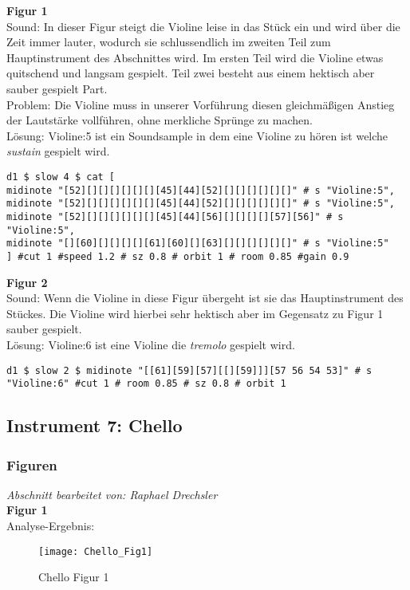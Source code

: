 \documentclass[
10pt, %
a4paper, %
oneside, %
headinclude,footinclude, %
BCOR5mm, %
]{scrartcl}
\begin{document}
\noindent\textbf{Figur 1}\\
Sound: In dieser Figur steigt die Violine leise in das Stück ein und wird über die Zeit immer lauter, wodurch sie schlussendlich im zweiten Teil 
zum Hauptinstrument des Abschnittes wird. Im ersten Teil wird die Violine etwas quitschend und langsam gespielt. Teil zwei besteht aus einem hektisch aber sauber gespielt Part.\\
Problem: Die Violine muss in unserer Vorführung diesen gleichmäßigen Anstieg der Lautstärke vollführen, ohne merkliche Sprünge zu machen.\\
Lösung: Violine:5 ist ein Soundsample in dem eine Violine zu hören ist welche \textit{sustain} gespielt wird.
\begin{lstlisting}
d1 $ slow 4 $ cat [
midinote "[52][][][][][][][45][44][52][][][][][][]" # s "Violine:5",
midinote "[52][][][][][][][45][44][52][][][][][][]" # s "Violine:5",
midinote "[52][][][][][][][45][44][56][][][][][57][56]" # s "Violine:5",
midinote "[][60][][][][][61][60][][63][][][][][][]" # s "Violine:5"
] #cut 1 #speed 1.2 # sz 0.8 # orbit 1 # room 0.85 #gain 0.9
\end{lstlisting}
\noindent\textbf{Figur 2}\\
Sound: Wenn die Violine in diese Figur übergeht ist sie das Hauptinstrument des Stückes. Die Violine wird hierbei sehr hektisch aber im Gegensatz zu Figur 1 sauber gespielt.\\
Lösung: Violine:6 ist eine Violine die \textit{tremolo} gespielt wird.
\begin{lstlisting}
d1 $ slow 2 $ midinote "[[61][59][57][[][59]]][57 56 54 53]" # s "Violine:6" #cut 1 # room 0.85 # sz 0.8 # orbit 1
\end{lstlisting}

\subsection{Instrument 7: Chello}
\subsubsection{Figuren}
\textit{Abschnitt bearbeitet von: Raphael Drechsler}\\

\noindent\textbf{Figur 1}\\
Analyse-Ergebnis:
\begin{figure}[h]
	\centering 
	\texttt{[image: Chello\_Fig1]} 
	\caption{Chello Figur 1}
\end{figure}
\end{document}
